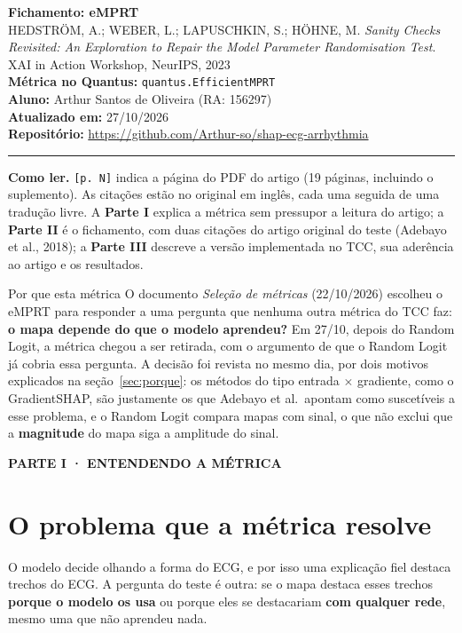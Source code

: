 \documentclass[11pt,a4paper]{article}
\newcommand{\partbar}[1]{\par\vspace{1.2em}\noindent\colorbox{black!80}{\parbox{\dimexpr\linewidth-2\fboxsep}{\color{white}\bfseries\sffamily\MakeUppercase{#1}}}\par\vspace{0.4em}}
\begin{document}
\begin{center}
    {\LARGE \textbf{Fichamento: eMPRT}} \\[0.35em]
    {\large HEDSTRÖM, A.; WEBER, L.; LAPUSCHKIN, S.; HÖHNE, M. \textit{Sanity Checks Revisited: An Exploration to Repair the Model Parameter Randomisation Test}. XAI in Action Workshop, NeurIPS, 2023} \\[0.3em]
    \textbf{Métrica no Quantus:} \texttt{quantus.EfficientMPRT} \\[0.2em]
    \textbf{Aluno:} Arthur Santos de Oliveira (RA: 156297) \\[0.2em]
    \textbf{Atualizado em:} 27/10/2026 \\[0.2em]
    \textbf{Repositório:} \url{https://github.com/Arthur-so/shap-ecg-arrhythmia}
\end{center}
\vspace{-0.5em}
\hrule
\vspace{0.8em}

\textbf{Como ler.} \texttt{[p. N]} indica a página do PDF do artigo (19 páginas, incluindo o suplemento). As citações estão no original em inglês, cada uma seguida de uma tradução livre. A \textbf{Parte I} explica a métrica sem pressupor a leitura do artigo; a \textbf{Parte II} é o fichamento, com duas citações do artigo original do teste (Adebayo et al., 2018); a \textbf{Parte III} descreve a versão implementada no TCC, sua aderência ao artigo e os resultados.

\begin{infobox}[note]{Por que esta métrica}
O documento \textit{Seleção de métricas} (22/10/2026) escolheu o eMPRT para responder a uma pergunta que nenhuma outra métrica do TCC faz: \textbf{o mapa depende do que o modelo aprendeu?} Em 27/10, depois do Random Logit, a métrica chegou a ser retirada, com o argumento de que o Random Logit já cobria essa pergunta. A decisão foi revista no mesmo dia, por dois motivos explicados na seção~\ref{sec:porque}: os métodos do tipo entrada $\times$ gradiente, como o GradientSHAP, são justamente os que Adebayo et al.\ apontam como suscetíveis a esse problema, e o Random Logit compara mapas com sinal, o que não exclui que a \textbf{magnitude} do mapa siga a amplitude do sinal.
\end{infobox}

\partbar{Parte I · Entendendo a métrica}

\section{O problema que a métrica resolve}
O modelo decide olhando a forma do ECG, e por isso uma explicação fiel destaca trechos do ECG. A pergunta do teste é outra: se o mapa destaca esses trechos \textbf{porque o modelo os usa} ou porque eles se destacariam \textbf{com qualquer rede}, mesmo uma que não aprendeu nada.
\end{document}
